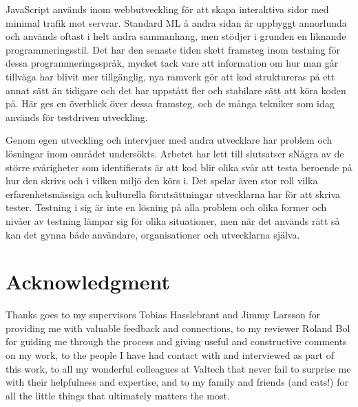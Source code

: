 JavaScript används inom webbutveckling för att skapa interaktiva sidor med minimal trafik mot servrar. Standard ML å andra sidan är uppbyggt annorlunda och används oftast i helt andra sammanhang, men stödjer i grunden en liknande programmeringsstil. Det har den senaste tiden skett framsteg inom testning för dessa programmeringsspråk, mycket tack vare att information om hur man går tillväga har blivit mer tillgänglig, nya ramverk gör att kod struktureras på ett annat sätt än tidigare och det har uppstått fler och stabilare sätt att köra koden på. Här ges en överblick över dessa framsteg, och de många tekniker som idag används för testdriven utveckling.

Genom egen utveckling och intervjuer med andra utvecklare har problem och lösningar inom området undersökts. Arbetet har lett till slutsatser sNågra av de större svårigheter som identifierats är att kod blir olika svår att testa beroende på hur den skrivs och i vilken miljö den körs i. Det spelar även stor roll vilka erfarenhetsmässiga och kulturella förutsättningar utvecklarna har för att skriva tester. Testning i sig är inte en lösning på alla problem och olika former och nivåer av testning lämpar sig för olika situationer, men när det används rätt så kan det gynna både användare, organisationer och utvecklarna själva.

\newpage

\section*{Acknowledgment}

Thanks goes to my supervisors Tobias Hasslebrant and Jimmy Larsson for providing me with valuable feedback and connections, to my reviewer Roland Bol for guiding me through the process and giving useful and constructive comments on my work, to the people I have had contact with and interviewed as part of this work, to all my wonderful colleagues at Valtech that never fail to surprise me with their helpfulness and expertise, and to my family and friends (and cats!) for all the little things that ultimately matters the most.

\newpage
\null
\newpage

\tableofcontents

\newpage


